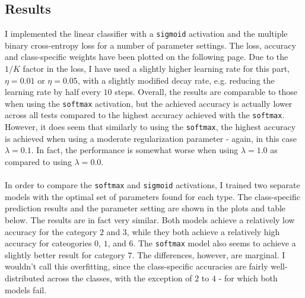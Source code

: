\documentclass{article}
\begin{document}
\newpage
\subsection*{Results}
	I implemented the linear classifier with a \texttt{sigmoid} activation and the multiple binary cross-entropy loss for a number of parameter settings. The loss, accuracy and class-specific weights have been plotted on the following page. Due to the $1/K$ factor in the loss, I have used a slightly higher learning rate for this part, $\eta=0.01$ or $\eta=0.05$, with a slightly modified decay rate, e.g. reducing the learning rate by half every $10$ steps. Overall, the results are comparable to those when using the \texttt{softmax} activation, but the achieved accuracy is actually lower across all tests compared to the highest accuracy achieved with the \texttt{softmax}. However, it does seem that similarly to using the \texttt{softmax}, the highest accuracy is achieved when using a moderate regularization parameter - again, in this case $\lambda = 0.1$. In fact, the performance is somewhat worse when using $\lambda = 1.0$ as compared to using $\lambda = 0.0$.\\\\
%
In order to compare the \texttt{softmax} and \texttt{sigmoid} activations, I trained two separate models with the optimal set of parameters found for each type. The class-specific prediction results and the parameter setting are shown in the plots and table below. The results are in fact very similar. Both models achieve a relatively low accuracy for the category $2$ and $3$, while they both achieve a relatively high accuracy for cateogories $0$, $1$, and $6$. The \texttt{softmax} model also seems to achieve a slightly better result for category $7$. The differences, however, are marginal. I wouldn't call this overfitting, since the class-specific accuracies are fairly well-distributed across the classes, with the exception of $2$ to $4$ - for which both models fail. 
\end{document}
